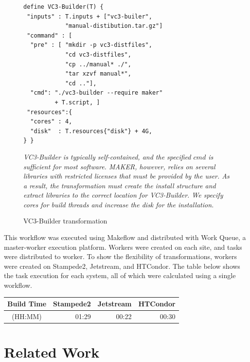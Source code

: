 \documentclass[conference]{IEEEtran}
\begin{document}
\begin{figure}
\begin{framed}
\begin{verbatim}
define VC3-Builder(T) {
 "inputs" : T.inputs + ["vc3-builer",
            "manual-distibution.tar.gz"]
 "command" : [
  "pre" : [ "mkdir -p vc3-distfiles",
            "cd vc3-distfiles",
            "cp ../manual* ./",
            "tar xzvf manual*",
            "cd .."],
  "cmd": "./vc3-builder --require maker"
         + T.script, ]
 "resources":{
  "cores" : 4,
  "disk"  : T.resources{"disk"} + 4G,
} }
\end{verbatim}
\end{framed}
\caption{VC3-Builder transformation}
\small
\emph{VC3-Builder is typically  
self-contained, and the specified
$cmd$ is sufficient for most software.
MAKER, however, relies on several libraries
with restricted licenses that must be
provided by the user. 
As a result, the transformation must
create the install structure and 
extract libraries to the correct
location for VC3-Builder.
We specify cores for build threads and 
increase the disk for the installation.
}
\label{vc3-builder}
\end{figure}

This workflow was executed using Makeflow
and distributed with Work Queue\cite{wq-python-pyhpc2011},
a master-worker execution platform. 
Workers were created on each site,
and tasks were distributed to worker.
To show the flexibility of transformations,
workers were created on Stampede2,
Jetstream, and HTCondor.
The table below shows the task execution
for each system, 
all of which were calculated using a single workflow.


\begin{center}
\begin{tabular}{| c | r | r | r |}
\hline
Build Time
  & \multicolumn{1}{|c|}{Stampede2} 
  & \multicolumn{1}{|c|}{Jetstream} 
  & \multicolumn{1}{|c|}{HTCondor} \\ \hline
 (HH:MM) & 01:29 & 00:22 & 00:30 \\ \hline
\end{tabular}
\end{center}

\section{Related Work}
\end{document}
